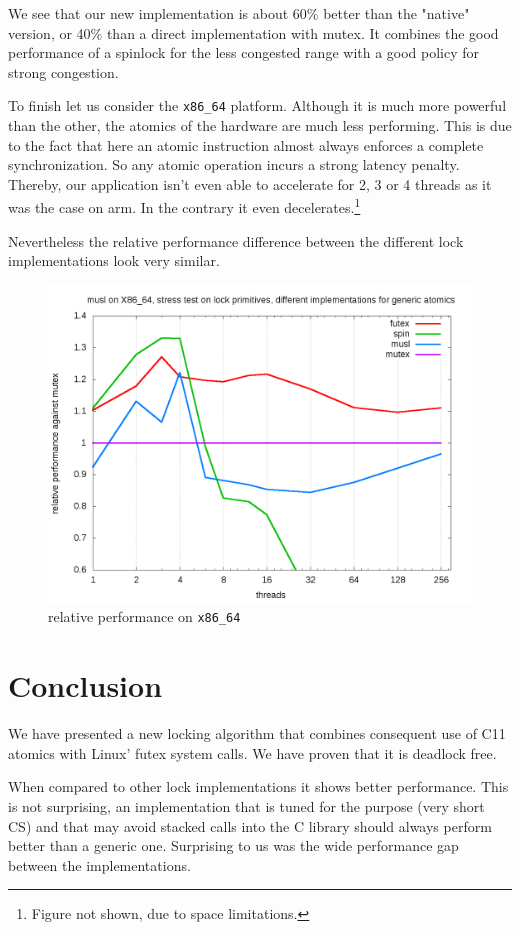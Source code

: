 We see that our new implementation is about 60\% better than
the "native" version, or 40\% than a direct implementation with
mutex. It combines the good performance of a spinlock for the less
congested range with a good policy for strong congestion.

To finish let us consider the \texttt{x86\_64} platform. Although it
is much more powerful than the other, the atomics of the hardware
are much less performing. This is due to the fact that here an
atomic instruction almost always enforces a complete
synchronization. So any atomic operation incurs a strong latency
penalty. Thereby, our application isn't even able to accelerate for
2, 3 or 4 threads as it was the case on arm. In the contrary it
even decelerates.\footnote{Figure not shown, due to space limitations.}

Nevertheless the relative performance difference between the
different lock implementations look very similar.
\begin{figure}
\includegraphics[width=0.95\linewidth]{benchs/x86_64/test-x86_64-musl-relative.png}
\caption{relative performance on \texttt{x86\_64}}
\label{fig:x86_64-rel}
\end{figure}

\section{Conclusion}
\label{sec-5}

We have presented a new locking algorithm that combines consequent use
of C11 atomics with Linux' futex system calls. We have proven that it
is deadlock free.

When compared to other lock implementations it shows better
performance. This is not surprising, an implementation that is tuned
for the purpose (very short CS) and that may avoid stacked calls into
the C library should always perform better than a generic one.
Surprising to us was the wide performance gap between the
implementations.

